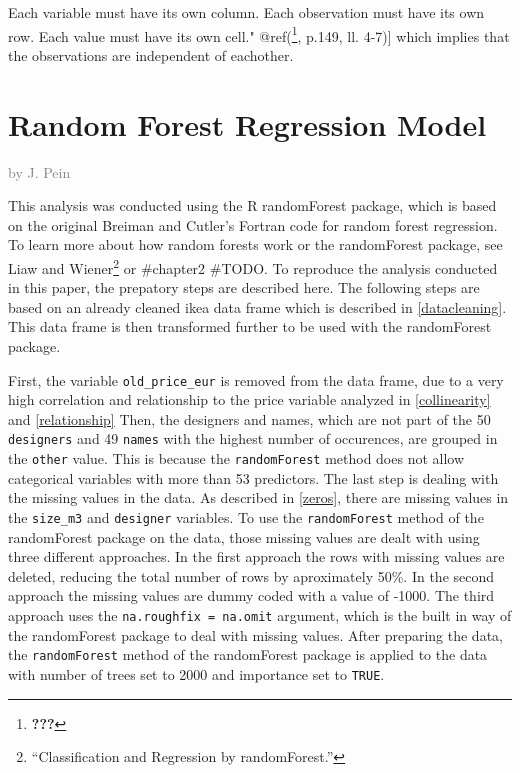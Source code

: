 \documentclass[a4paper, nobind]{templates/ociamthesis}
\begin{document}
Each variable must have its own column.
Each observation must have its own row.
Each value must have its own cell." @ref(\footnote{{\textbf{???}}}, p.149, ll. 4-7){]} which implies that the observations are independent of eachother.

\hypertarget{rf}{%
\section{Random Forest Regression Model}\label{rf}}

\textcolor{gray}{by J. Pein}

This analysis was conducted using the R randomForest package, which is based on the original Breiman and Cutler's Fortran code for random forest regression. To learn more about how random forests work or the randomForest package, see Liaw and Wiener\footnote{``Classification and Regression by randomForest.''} or \#chapter2 \#TODO. To reproduce the analysis conducted in this paper, the prepatory steps are described here. The following steps are based on an already cleaned ikea data frame which is described in \ref{datacleaning}. This data frame is then transformed further to be used with the randomForest package.

First, the variable \texttt{old\_price\_eur} is removed from the data frame, due to a very high correlation and relationship to the price variable analyzed in \ref{collinearity} and \ref{relationship} Then, the designers and names, which are not part of the 50 \texttt{designers} and 49 \texttt{names} with the highest number of occurences, are grouped in the \texttt{other} value. This is because the \texttt{randomForest} method does not allow categorical variables with more than 53 predictors. The last step is dealing with the missing values in the data. As described in \ref{zeros}, there are missing values in the \texttt{size\_m3} and \texttt{designer} variables. To use the \texttt{randomForest} method of the randomForest package on the data, those missing values are dealt with using three different approaches. In the first approach the rows with missing values are deleted, reducing the total number of rows by aproximately 50\%. In the second approach the missing values are dummy coded with a value of -1000. The third approach uses the \texttt{na.roughfix\ =\ na.omit} argument, which is the built in way of the randomForest package to deal with missing values.
After preparing the data, the \texttt{randomForest} method of the randomForest package is applied to the data with number of trees set to 2000 and importance set to \texttt{TRUE}.
\end{document}
